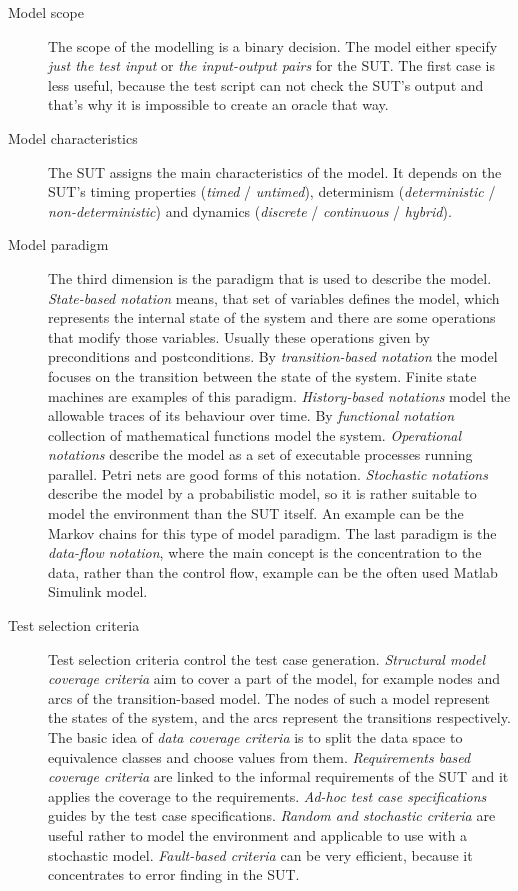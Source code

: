 \begin{description}
	\item[Model scope] The scope of the modelling is a binary decision. The model either specify \textit{just the test input} or \textit{the input-output pairs} for the SUT. The first case is less useful, because the test script can not check the SUT's output and that's why it is impossible to create an oracle that way.
	
	\item[Model characteristics] The SUT assigns the main characteristics of the model. It depends on the SUT's timing properties (\textit{timed} / \textit{untimed}), determinism (\textit{deterministic} / \textit{non-deterministic}) and dynamics (\textit{discrete} / \textit{continuous} / \textit{hybrid}).
	
	\item[Model paradigm] The third dimension is the paradigm that is used to describe the model. \textit{State-based notation} means, that set of variables defines the model, which represents the internal state of the system and there are some operations that modify those variables. Usually these operations given by preconditions and postconditions. By \textit{transition-based notation} the model focuses on the transition between the state of the system. Finite state machines are examples of this paradigm. \textit{History-based notations} model the allowable traces of its behaviour over time. By \textit{functional notation} collection of mathematical functions model the system. \textit{Operational notations} describe the model as a set of executable processes running parallel. Petri nets are good forms of this notation. \textit{Stochastic notations} describe the model by a probabilistic model, so it is rather suitable to model the environment than the SUT itself. An example can be the Markov chains for this type of model paradigm. The last paradigm is the \textit{data-flow notation}, where the main concept is the concentration to the data, rather than the control flow, example can be the often used Matlab Simulink model.
	
	\item[Test selection criteria] Test selection criteria control the test case generation. \textit{Structural model coverage criteria} aim to cover a part of the model, for example nodes and arcs of the transition-based model. The nodes of such a model represent the states of the system, and the arcs represent the transitions respectively. The basic idea of \textit{data coverage criteria} is to split the data space to equivalence classes and choose values from them. \textit{Requirements based coverage criteria} are linked to the informal requirements of the SUT and it applies the coverage to the requirements. \textit{Ad-hoc test case specifications} guides by the test case specifications. \textit{Random and stochastic criteria} are useful rather to model the environment and applicable to use with a stochastic model. \textit{Fault-based criteria} can be very efficient, because it concentrates to error finding in the SUT.
	

\end{description}
